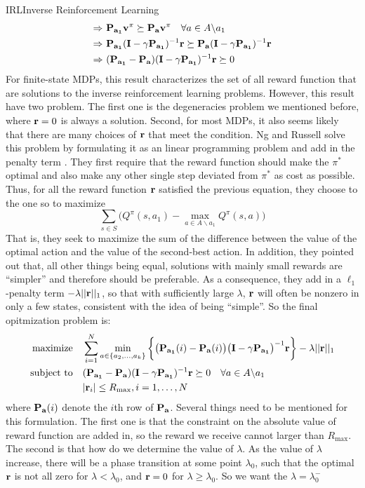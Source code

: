 \documentclass[9pt]{article}
\begin{document}
\begin{topic}{IRL}{Inverse Reinforcement Learning}
\[\begin{split}
\Rightarrow &\ \mathbf{P_{a_1}}  \mathbf{v^{\pi}} \succeq  \mathbf{P_a}  \mathbf{v^{\pi}}  \quad \forall a\in A \backslash a_1\\
\Rightarrow &\ \mathbf{P_{a_1}}(\mathbf{I} - \gamma\mathbf{P_{a_1}})^{-1} \mathbf{r} \succeq \mathbf{P_{a}}(\mathbf{I} - \gamma\mathbf{P_{a_1}})^{-1} \mathbf{r}\\
\Rightarrow &\ (\mathbf{P_{a_1}} - \mathbf{P_{a}})(\mathbf{I} - \gamma\mathbf{P_{a_1}})^{-1}\mathbf{r} \succeq 0
\end{split}
\]
For finite-state MDPs, this result characterizes the set of all reward function that  are solutions to the inverse reinforcement learning problems. However, this result have two problem. The first one is the degeneracies problem we mentioned before, where $\mathbf{r} = 0$ is always a solution. Second, for most MDPs, it also seems likely that there are many choices of $\mathbf{r}$ that meet the condition.  Ng and Russell solve this problem by formulating it as an linear programming problem and add in the penalty term \citep{Ng2000Algorithms}. They first require that the reward function should make the $\pi^*$ optimal and also make any other single step deviated from $\pi^*$ as cost as possible. Thus, for all the reward function $\mathbf{r}$ satisfied the previous equation, they choose to the one so to maximize
\[
\sum_{s\in S} \bigg(Q^{\pi}(s, a_1) - \max_{a\in A\backslash a_1}Q^{\pi}(s,a)\bigg)
\]
That is, they seek to maximize the sum of the difference between  the value of the optimal action and the value of the second-best action. In addition, they pointed out that, all other things being equal, solutions with mainly small rewards are ``simpler'' and therefore should be preferable. As a consequence, they add in a $\ell_1$-penalty term $-\lambda||\mathbf{r}||_1$, so that with sufficiently large $\lambda$, $\mathbf{r}$ will often be nonzero in only a few states, consistent with the idea of being ``simple''. So the final opitmization problem is:
\[
\begin{split}
\text{maximize} & \quad \sum_{i=1}^{N} \min_{a\in \{a_2,\ldots,a_k\}}\bigg\{ \big(\mathbf{P_{a_1}}(i)-\mathbf{P_{a}}(i)\big)\big(\mathbf{I} - \gamma\mathbf{P_{a_1}}\big)^{-1}\mathbf{r} \bigg\}-\lambda ||\mathbf{r}||_1\\
\text{subject to} & \quad (\mathbf{P_{a_1}} - \mathbf{P_{a}})(\mathbf{I} - \gamma\mathbf{P_{a_1}})^{-1}\mathbf{r}  \succeq 0 \quad \forall a \in A \backslash a_1\\
& \quad |\mathbf{r}_i| \le R_{\text{max}}, i = 1, \ldots, N
\end{split}
\]
where $\mathbf{P_{a}}(i)$ denote the $i$th row of $\mathbf{P_{a}}$. Several things need to be mentioned for this formulation. The first one is that  the constraint on the absolute value of reward function are added in, so the reward we receive cannot larger than $R_{\text{max}}$. The second is that how do we determine the value of $\lambda$. As the value of $\lambda$ increase, there will be a phase transition at some point $\lambda_0$, such that the optimal $\mathbf{r}$ is not all zero for $\lambda < \lambda_0$, and $\mathbf{r} = 0$ for $\lambda \ge \lambda_0$. So we want the $\lambda = \lambda_0^{-}$



\end{topic}
\end{document}
